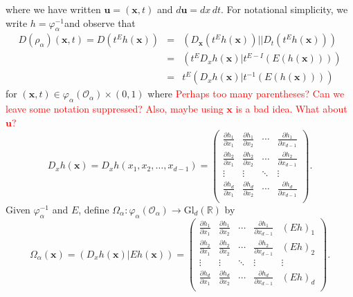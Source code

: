 \documentclass[11pt]{article}
\theoremstyle{theorem}
\newcommand\GldR{\mbox{Gl}_d(\mathbb{R})}%
\begin{document}
where we have written $\mathbf{u}=(\mathbf{x},t)$ and $d\mathbf{u}=dx\,dt$. For notational simplicity, we write $h=\varphi_{\alpha}^{-1}$and observe that
\begin{eqnarray*}
D(\rho_\alpha)(\mathbf{x},t)=D(t^Eh(\mathbf{x}))&=&\left(D_{\mathbf{x}}\left(t^Eh(\mathbf{x})\right)\big\vert|D_t\left(t^Eh(\mathbf{x})\right)\right)\\
&=&\left(t^E D_x h(\mathbf{x})\big\vert t^{E-I}(E(h(\mathbf{x})))\right)\\
&=&t^E\left(D_x h(\mathbf{x})\big\vert t^{-1}(E(h(\mathbf{x})))\right)
\end{eqnarray*}
for $(\mathbf{x},t)\in \varphi_\alpha(\mathcal{O}_\alpha)\times (0,1)$ where \textcolor{red}{Perhaps too many parentheses? Can we leave some notation suppressed? Also, maybe using $\mathbf{x}$ is a bad idea. What about $\mathbf{u}$?}
\begin{equation*}
D_x h(\mathbf{x})=D_x h(x_1,x_2,\dots,x_{d-1})=
\begin{pmatrix}
\frac{\partial h_1}{\partial x_1} & \frac{\partial h_1}{\partial x_2} & \cdots & \frac{\partial h_1}{\partial x_{d-1}}\\
\frac{\partial h_2}{\partial x_1} & \frac{\partial h_2}{\partial x_2} & \cdots & \frac{\partial h_2}{\partial x_{d-1}}\\
 \vdots & \vdots &\ddots & \vdots\\
\frac{\partial h_d}{\partial x_1} & \frac{\partial h_d}{\partial x_2} & \cdots & \frac{\partial h_d}{\partial x_{d-1}}\\
\end{pmatrix}.
\end{equation*}
Given $\varphi_\alpha^{-1}$ and $E$, define $\Omega_\alpha:\varphi_{\alpha}(\mathcal{O}_\alpha)\to \GldR$ by
\begin{equation*}
\Omega_\alpha(\mathbf{x})=\left(D_x h(\mathbf{x})\big\vert Eh(\mathbf{x})\right)=
\begin{pmatrix}
\frac{\partial h_1}{\partial x_1} & \frac{\partial h_1}{\partial x_2} & \cdots & \frac{\partial h_1}{\partial x_{d-1}} & (Eh)_1\\
\frac{\partial h_2}{\partial x_1} & \frac{\partial h_2}{\partial x_2} & \cdots & \frac{\partial h_2}{\partial x_{d-1}} & (Eh)_2\\
 \vdots & \vdots &\ddots & \vdots & \vdots \\
\frac{\partial h_d}{\partial x_1} & \frac{\partial h_d}{\partial x_2} & \cdots & \frac{\partial h_d}{\partial x_{d-1}} & (Eh)_d\\
\end{pmatrix}.
\end{equation*}
\end{document}
